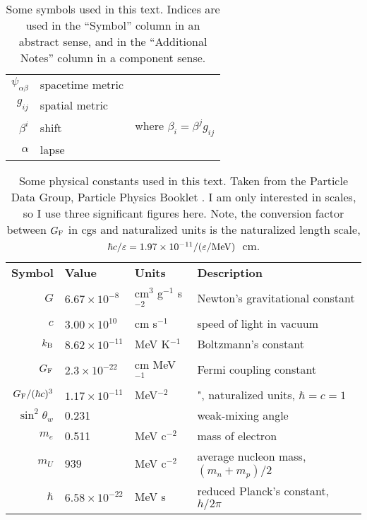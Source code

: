 \begin{table}
\begin{tabular}{rll}
    $\psi_{\alpha\beta}$  & spacetime metric          & \\
    $g_{ij}$              & spatial metric            & \\
    $\beta^i$             & shift                     & where $\beta_i = \beta^j g_{ij}$ \\
    $\alpha$              & lapse                     & \\
  \end{tabular}
  \caption[Symbols used in the text]{
    Some symbols used in this text.
    Indices are used in the ``Symbol'' column in an abstract sense, and in the
    ``Additional Notes'' column in a component sense.
  }
  \label{tab:conventions}
\end{table}

\begin{table}
  \centering
  \begin{tabular}{rlll}
    \textbf{Symbol} & \textbf{Value}       & \textbf{Units}           & \textbf{Description} \\
    $G$             & $6.67\times10^{-8}$  & cm$^3$ g$^{-1}$ s$^{-2}$ & Newton's gravitational constant \\
    $c$             & $3.00\times10^{10}$  & cm s$^{-1}$              & speed of light in vacuum \\
    $k_{\rm B}$     & $8.62\times10^{-11}$ & MeV K$^{-1}$             & Boltzmann's constant \\
    $G_{\rm F}$     & $2.3\times10^{-22}$  & cm MeV$^{-1}$            & Fermi coupling constant \\
    $G_{\rm F}/(\hbar c)^3$ & $1.17\times10^{-11}$ & MeV$^{-2}$       & ", naturalized units, $\hbar=c=1$ \\
    $\sin^2\theta_w$& 0.231                &                          & weak-mixing angle \\
    $m_e$           & 0.511                & MeV c$^{-2}$             & mass of electron \\
    $m_U$           & 939                  & MeV c$^{-2}$             & average nucleon mass, $(m_n+m_p)/2$ \\
    $\hbar$         & $6.58\times10^{-22}$ & MeV s                    & reduced Planck's constant, $h/2\pi$ \\
  \end{tabular}
  \caption[Physical constants used in the text]{
    Some physical constants used in this text. Taken from the Particle Data
    Group, Particle Physics Booklet \citep{oliv2014-pdg}.
    I am only interested in scales, so I use three significant figures here.
    Note, the conversion factor between $G_{\rm F}$ in cgs and
    naturalized units is the naturalized length scale,
    $\hbar c/\varepsilon=1.97\times10^{-11}/(\varepsilon/{\rm MeV})$~cm.
  }
  \label{tab:constants}
\end{table}
